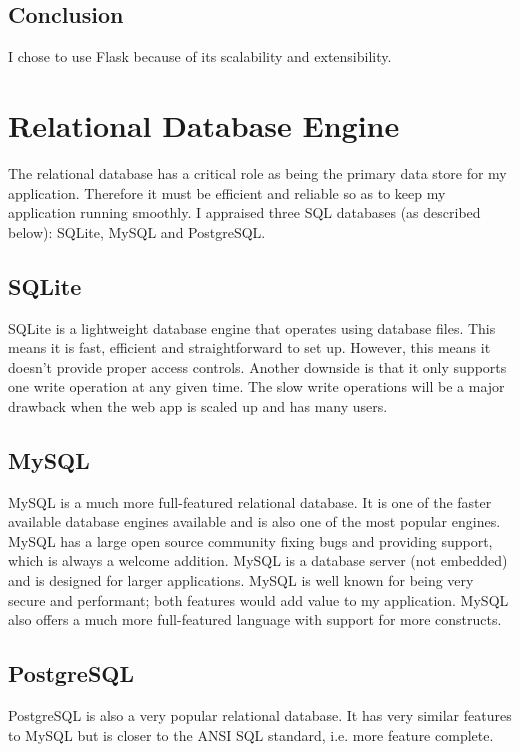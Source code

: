 \documentclass[a4paper,oneside,12pt]{report}
\begin{document}
	\subsection{Conclusion}
	I chose to use Flask because of its scalability and extensibility. 

	\section{Relational Database Engine}
	The relational database has a critical role as being the primary data store for my application. Therefore it must be efficient and reliable so as to keep my application running smoothly. I appraised three SQL databases (as described below): SQLite, MySQL and PostgreSQL.

	\subsection{SQLite}
	SQLite is a lightweight database engine that operates using database files. This means it is fast, efficient and straightforward to set up. However, this means it doesn’t provide proper access controls. Another downside is that it only supports one write operation at any given time. The slow write operations will be a major drawback when the web app is scaled up and has many users.

	\subsection{MySQL}
	MySQL is a much more full-featured relational database. It is one of the faster available database engines available and is also one of the most popular engines. MySQL has a large open source community fixing bugs and providing support, which is always a welcome addition. MySQL is a database server (not embedded) and is designed for larger applications. MySQL is well known for being very secure and performant; both features would add value to my application. MySQL also offers a much more full-featured language with support for more constructs.

	\subsection{PostgreSQL}
	PostgreSQL is also a very popular relational database. It has very similar features to MySQL but is closer to the ANSI SQL standard, i.e. more feature complete. 
	
\end{document}
